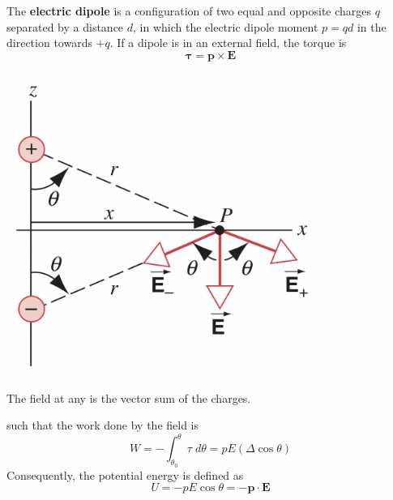\documentclass{tufte-book}
\renewcommand{\b}{\mathbf}
\begin{document}
The \textbf{electric dipole} is a configuration of two equal and opposite charges $q$ separated by a distance $d$, in which the electric dipole moment $p = qd$ in the direction towards $+q$. If a dipole is in an external field, the torque is \begin{equation}
  \b \tau = \b p \times \b E
\end{equation}
%
\begin{marginfigure}
  \includegraphics[width=0.8\textwidth]{dipole}
  \caption{The field at any is the vector sum of the charges.}
\end{marginfigure}
%
such that the work done by the field is \begin{equation}
  W = - \int_{\theta_0}^\theta \tau \; d \theta = pE(\Delta \cos \theta)
\end{equation}
Consequently, the potential energy is defined as \begin{equation}
  U = -pE \cos \theta = - \b p \cdot \b E
\end{equation}
\end{document}
